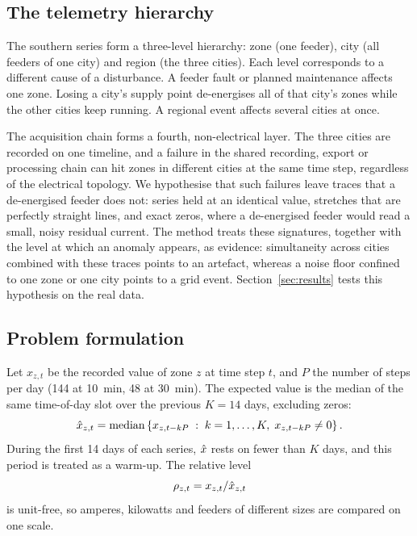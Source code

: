 \subsection{The telemetry hierarchy}\label{sec:hierarchy}

The southern series form a three-level hierarchy: zone (one feeder), city (all feeders of one city) and region (the three cities). Each level corresponds to a different cause of a disturbance. A feeder fault or planned maintenance affects one zone. Losing a city's supply point de-energises all of that city's zones while the other cities keep running. A regional event affects several cities at once.

The acquisition chain forms a fourth, non-electrical layer. The three cities are recorded on one timeline, and a failure in the shared recording, export or processing chain can hit zones in different cities at the same time step, regardless of the electrical topology. We hypothesise that such failures leave traces that a de-energised feeder does not: series held at an identical value, stretches that are perfectly straight lines, and exact zeros, where a de-energised feeder would read a small, noisy residual current. The method treats these signatures, together with the level at which an anomaly appears, as evidence: simultaneity across cities combined with these traces points to an artefact, whereas a noise floor confined to one zone or one city points to a grid event. Section~\ref{sec:results} tests this hypothesis on the real data.

\subsection{Problem formulation}\label{sec:problem}

Let $x_{z,t}$ be the recorded value of zone $z$ at time step $t$, and $P$ the number of steps per day (144 at 10~min, 48 at 30~min). The expected value is the median of the same time-of-day slot over the previous $K = 14$ days, excluding zeros:
\begin{equation}
\hat{x}_{z,t} = \operatorname{median}\left\{ x_{z,t-kP} \;:\; k = 1,\dots,K,\; x_{z,t-kP} \neq 0 \right\}.
\label{eq:expected}
\end{equation}
During the first 14 days of each series, $\hat{x}$ rests on fewer than $K$ days, and this period is treated as a warm-up. The relative level
\begin{equation}
\rho_{z,t} = x_{z,t}/\hat{x}_{z,t}
\label{eq:rho}
\end{equation}
is unit-free, so amperes, kilowatts and feeders of different sizes are compared on one scale.

